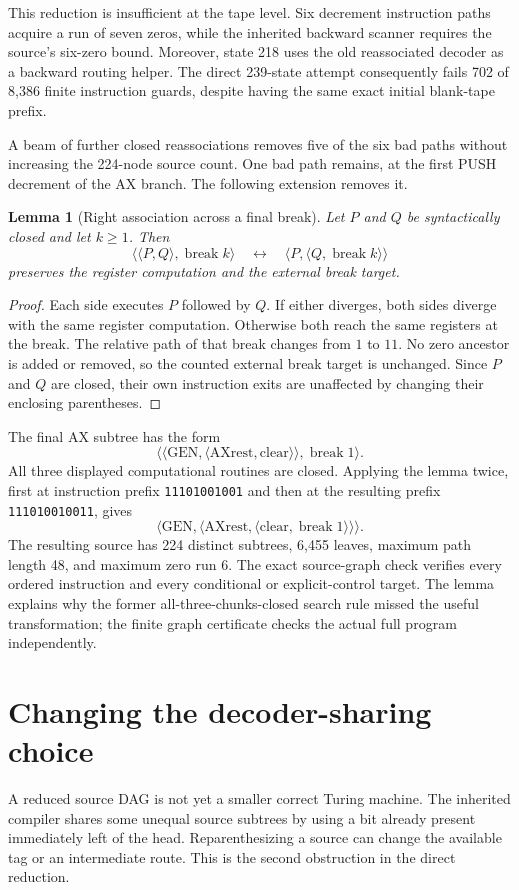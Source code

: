 \documentclass[10pt]{article}
\newtheorem{lemma}{Lemma}
\newcommand{\Seq}[2]{\langle #1,#2\rangle}
\newcommand{\CB}{\operatorname{break}}
\begin{document}
This reduction is insufficient at the tape level. Six decrement instruction
paths acquire a run of seven zeros, while the inherited backward scanner
requires the source's six-zero bound. Moreover, state 218 uses the old
reassociated decoder as a backward routing helper. The direct 239-state
attempt consequently fails 702 of 8,386 finite instruction guards, despite
having the same exact initial blank-tape prefix.

A beam of further closed reassociations removes five of the six bad paths
without increasing the 224-node source count. One bad path remains, at the
first PUSH decrement of the AX branch. The following extension removes it.

\begin{lemma}[Right association across a final break]
Let $P$ and $Q$ be syntactically closed and let $k\geq 1$. Then
\[
 \Seq{\Seq{P}{Q}}{\CB k}
 \quad\longleftrightarrow\quad
 \Seq{P}{\Seq{Q}{\CB k}}
\]
preserves the register computation and the external break target.
\end{lemma}
\begin{proof}
Each side executes $P$ followed by $Q$. If either diverges, both sides diverge
with the same register computation. Otherwise both reach the same registers
at the break. The relative path of that break changes from $1$ to $11$.
No zero ancestor is added or removed, so the counted external break target
is unchanged. Since $P$ and $Q$ are closed, their own instruction exits are
unaffected by changing their enclosing parentheses.
\end{proof}

The final AX subtree has the form
\[
 \Seq{\Seq{\mathrm{GEN}}{\Seq{\mathrm{AXrest}}{\mathrm{clear}}}}{\CB 1}.
\]
All three displayed computational routines are closed. Applying the lemma
twice, first at instruction prefix \texttt{11101001001} and then at the
resulting prefix \texttt{111010010011}, gives
\[
 \Seq{\mathrm{GEN}}{
   \Seq{\mathrm{AXrest}}{\Seq{\mathrm{clear}}{\CB 1}}}.
\]
The resulting source has 224 distinct subtrees, 6,455 leaves, maximum path
length 48, and maximum zero run 6. The exact source-graph check verifies every
ordered instruction and every conditional or explicit-control target. The
lemma explains why the former all-three-chunks-closed search rule missed the
useful transformation; the finite graph certificate checks the actual full
program independently.

\section{Changing the decoder-sharing choice}
A reduced source DAG is not yet a smaller correct Turing machine. The
inherited compiler shares some unequal source subtrees by using a bit already
present immediately left of the head. Reparenthesizing a source can change
the available tag or an intermediate route. This is the second obstruction
in the direct reduction.
\end{document}
